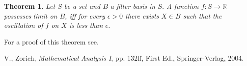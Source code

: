 \documentclass[12pt]{article}
\newtheorem{theorem*}{Theorem}
\begin{document}
\begin{theorem*}
Let $S$ be a set and $B$ a filter basis in $S$. A function $f:S \to \mathbb{R}$ possesses limit on $B$, iff for every $\epsilon > 0$ there exists $X\in B$ such that the oscillation of $f$ on $X$ is less than $\epsilon$.
\end{theorem*}
For a proof of this theorem see\cite{cite:Zorich}.
   
\begin{thebibliography}{99}
V., Zorich, {\em Mathematical Analysis I}, pp. 132ff, First Ed., Springer-Verlag, 2004.
\end{thebibliography}

\end{document}
